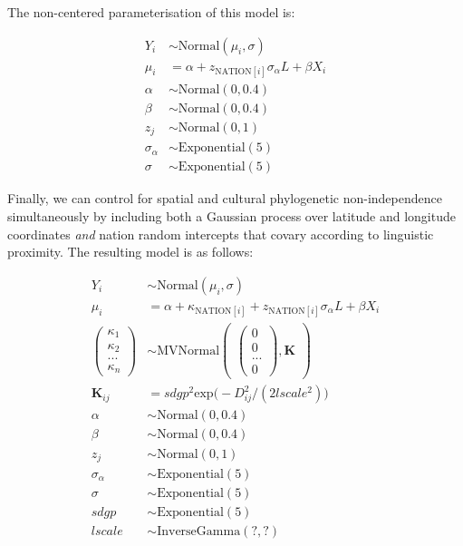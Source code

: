 \documentclass[
  man,floatsintext]{apa6}
\begin{document}
The non-centered parameterisation of this model is:

\begin{align}
Y_{i} &\sim \text{Normal}(\mu_{i},\sigma) \\
\mu_{i} &= \alpha + z_{\text{NATION}[i]}\sigma_{\alpha}L + \beta X_{i} \nonumber \\
\alpha &\sim \text{Normal}(0, 0.4) \nonumber \\
\beta &\sim \text{Normal}(0, 0.4) \nonumber \\
z_{j} &\sim \text{Normal}(0, 1) \nonumber \\
\sigma_{\alpha} &\sim \text{Exponential}(5) \nonumber \\
\sigma &\sim \text{Exponential}(5) \nonumber 
\end{align}

Finally, we can control for spatial and cultural phylogenetic non-independence simultaneously by including both a Gaussian process over latitude and longitude coordinates \emph{and} nation random intercepts that covary according to linguistic proximity. The resulting model is as follows:

\begin{align}
Y_{i} &\sim \text{Normal}(\mu_{i},\sigma) \\
\mu_{i} &= \alpha + \kappa_{\text{NATION}[i]} + z_{\text{NATION}[i]}\sigma_{\alpha}L + \beta X_{i} \nonumber \\
\begin{pmatrix}
\kappa_{1} \\ \kappa_{2} \\ ... \\ \kappa_{n}
\end{pmatrix} &\sim \text{MVNormal}
\begin{pmatrix}
\begin{pmatrix}
0 \\ 0 \\ ... \\ 0
\end{pmatrix},\textbf{K}
\end{pmatrix} \nonumber \\
\textbf{K}_{ij} &= sdgp^2 \text{exp} \big (-D_{ij}^2 / (2 lscale^2) \big ) \nonumber \\
\alpha &\sim \text{Normal}(0, 0.4) \nonumber \\
\beta &\sim \text{Normal}(0, 0.4) \nonumber \\
z_{j} &\sim \text{Normal}(0, 1) \nonumber \\
\sigma_{\alpha} &\sim \text{Exponential}(5) \nonumber \\
\sigma &\sim \text{Exponential}(5) \nonumber \\
sdgp &\sim \text{Exponential}(5) \nonumber \\
lscale &\sim \text{InverseGamma}(?,?) \nonumber 
\end{align}
\end{document}

